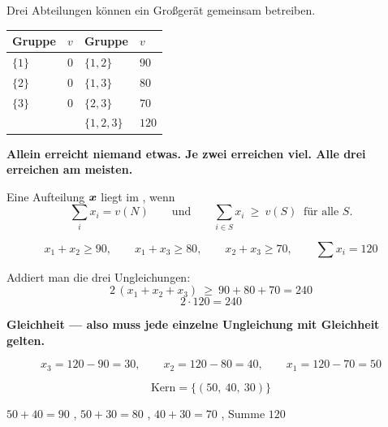 \begin{merksatz}
Drei Abteilungen können ein Großgerät gemeinsam betreiben.

\begin{center}
{\small
\renewcommand{\arraystretch}{1.5}
\begin{tabular}{@{}P{2.2cm}P{1.6cm}P{2.2cm}P{1.6cm}@{}}
\toprule
\textbf{Gruppe} & $v$ & \textbf{Gruppe} & $v$\\
\midrule
$\{1\}$ & $0$ & $\{1,2\}$ & $90$\\
$\{2\}$ & $0$ & $\{1,3\}$ & $80$\\
$\{3\}$ & $0$ & $\{2,3\}$ & $70$\\
& & $\{1,2,3\}$ & $120$\\
\bottomrule
\end{tabular}}
\end{center}

\begin{center}
\begin{minipage}{0.9\textwidth}
\textbf{Allein erreicht niemand etwas. Je zwei erreichen viel. Alle drei erreichen am meisten.}
\end{minipage}
\end{center}
\end{merksatz}

\begin{definition}
Eine Aufteilung $\boldsymbol{x}$ liegt im , wenn
\[ \sum_i x_i = v(N) \qquad\text{und}\qquad \sum_{i\in S} x_i \ \ge\ v(S) \ \text{ für alle } S . \]
\end{definition}

\begin{merksatz}
\[ x_1+x_2 \ge 90, \qquad x_1+x_3 \ge 80, \qquad x_2+x_3 \ge 70, \qquad \textstyle\sum x_i = 120 \]

Addiert man die drei Ungleichungen:
\[ 2\,(x_1+x_2+x_3) \ \ge\ 90+80+70 = 240 \]
\[ 2\cdot120 = 240 \]

\begin{center}
\begin{minipage}{0.9\textwidth}
\textbf{Gleichheit --- also muss jede einzelne Ungleichung mit Gleichheit gelten.}
\end{minipage}
\end{center}

\[ x_3 = 120-90 = 30, \qquad x_2 = 120-80 = 40, \qquad x_1 = 120-70 = 50 \]

\[ \text{Kern} = \{(50,\ 40,\ 30)\} \]

 $50+40 = 90$ \checkmark, $50+30 = 80$ \checkmark, $40+30 = 70$ \checkmark, Summe $120$ \checkmark
\end{merksatz}

